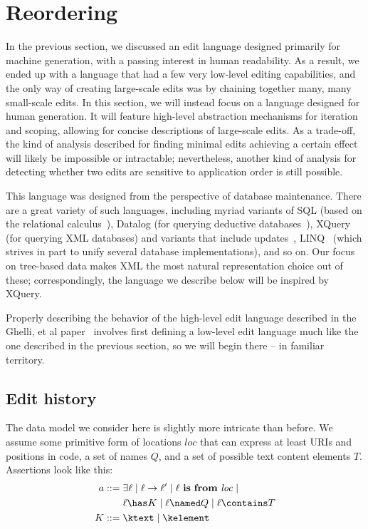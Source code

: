 \documentclass{article}
\newcommand{\mbf}[1]{\ensuremath{\mathbf{#1}}}
\newcommand{\loc}{\ensuremath{\mathit{loc}}\xspace}
\newcommand{\isfrom}{\ \mbf{is}\ \mbf{from}\ }
\begin{document}
\section{Reordering}
\label{sec:commutativity}
In the previous section, we discussed an edit language designed primarily
for machine generation, with a passing interest in human readability. As a
result, we ended up with a language that had a few very low-level editing
capabilities, and the only way of creating large-scale edits was by chaining
together many, many small-scale edits. In this section, we will instead
focus on a language designed for human generation. It will feature
high-level abstraction mechanisms for iteration and scoping, allowing for
concise descriptions of large-scale edits. As a trade-off, the kind of
analysis described for finding minimal edits achieving a certain effect will
likely be impossible or intractable; nevertheless, another kind of analysis
for detecting whether two edits are sensitive to application order is still
possible.

This language was designed from the perspective of database maintenance.
There are a great variety of such languages, including myriad variants of
SQL (based on the relational calculus~\cite{codd1970relational}), Datalog
(for querying deductive databases~\cite{minker1987foundations}),
XQuery~\cite{boag2002xquery} (for querying XML databases) and variants that
include updates~\cite{sur2004xquery}, LINQ~\cite{meijer2006linq} (which
strives in part to unify several database implementations), and so on. Our
focus on tree-based data makes XML the most natural representation choice
out of these; correspondingly, the language we describe below will be
inspired by XQuery.

Properly describing the behavior of the high-level edit language described
in the Ghelli, et al paper~\cite{ghelli2006commutativity} involves first
defining a low-level edit language much like the one described in the
previous section, so we will begin there -- in familiar territory.

\subsection{Edit history}
The data model we consider here is slightly more intricate than before.  We
assume some primitive form of locations \loc that can express at least URIs
and positions in code, a set of names $Q$, and a set of possible text
content elements $T$. Assertions look like this:
\begin{align*}
    a ::={}
    & \exists\ell \mid \ell\to\ell' \mid \ell\isfrom\loc \mid \\
    & \ell \has K \mid \ell \named Q \mid \ell \contains T \\
    K ::={} & \ktext \mid \kelement
\end{align*}
\end{document}
